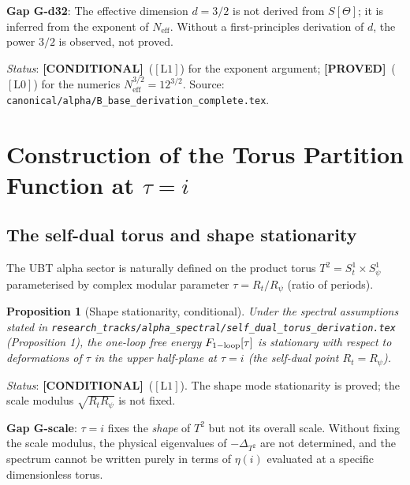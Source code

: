 \documentclass[12pt,a4paper]{article}
\newtheorem{proposition}[theorem]{Proposition}
\theoremstyle{definition}
\theoremstyle{remark}
\newcommand{\PROVED}{\textcolor{green!60!black}{\textbf{[PROVED]}}}
\newcommand{\CONDITIONAL}{\textcolor{blue!70!black}{\textbf{[CONDITIONAL]}}}
\newcommand{\Lzero}{$[\mathrm{L0}]$}
\newcommand{\Lone}{$[\mathrm{L1}]$}
\newcommand{\Neff}{N_{\mathrm{eff}}}
\begin{document}
\begin{gapbox}
\textbf{Gap G-d32}: The effective dimension $d=3/2$ is not derived from
$S[\Theta]$; it is inferred from the exponent of $\Neff$.  Without a
first-principles derivation of $d$, the power $3/2$ is observed, not proved.
\end{gapbox}

\noindent\textit{Status}: \CONDITIONAL\ (\Lone) for the exponent argument;
\PROVED\ (\Lzero) for the numerics $\Neff^{3/2} = 12^{3/2}$.
Source: \texttt{canonical/alpha/B\_base\_derivation\_complete.tex}.

\section{Construction of the Torus Partition Function at $\tau = i$}
\label{sec:eta:torus}

\subsection{The self-dual torus and shape stationarity}
\label{sec:eta:torus:shape}

The UBT alpha sector is naturally defined on the product torus
$T^2 = S^1_t \times S^1_\psi$ parameterised by complex modular parameter
$\tau = R_t/R_\psi$ (ratio of periods).

\begin{proposition}[Shape stationarity, conditional]
Under the spectral assumptions stated in
\texttt{research\_tracks/alpha\_spectral/self\_dual\_torus\_derivation.tex}
(Proposition 1), the one-loop free energy $F_{\rm 1-loop}[\tau]$ is
stationary with respect to deformations of $\tau$ in the upper half-plane at
$\tau = i$ (the self-dual point $R_t = R_\psi$).
\end{proposition}

\noindent\textit{Status}: \CONDITIONAL\ (\Lone).  The shape mode stationarity
is proved; the scale modulus $\sqrt{R_t R_\psi}$ is not fixed.

\begin{gapbox}
\textbf{Gap G-scale}: $\tau = i$ fixes the \emph{shape} of $T^2$ but not
its overall scale.  Without fixing the scale modulus, the physical
eigenvalues of $-\Delta_{T^2}$ are not determined, and the spectrum cannot
be written purely in terms of $\eta(i)$ evaluated at a specific dimensionless
torus.
\end{gapbox}
\end{document}
